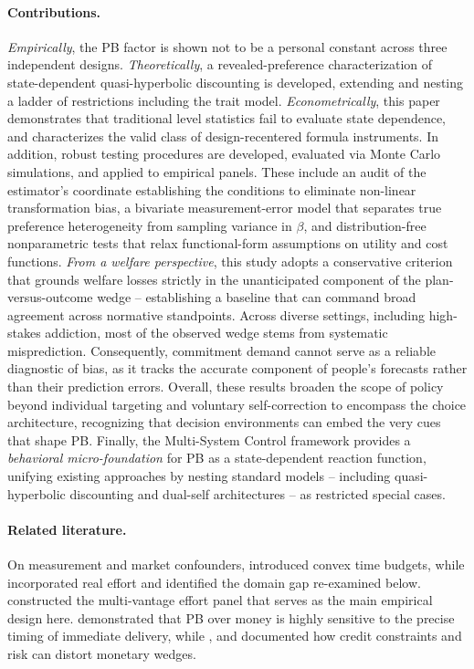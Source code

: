 \documentclass[11pt,a4paper]{article}
\theoremstyle{plain}
\theoremstyle{definition}
\begin{document}
\paragraph{Contributions.} 
\emph{Empirically}, the PB factor is shown not to be a personal constant across three independent designs. 
\emph{Theoretically}, a revealed-preference characterization of state-dependent quasi-hyperbolic discounting is developed, extending \citet{eis2020} and nesting a ladder of restrictions including the trait model.
\emph{Econometrically}, this paper demonstrates that traditional level statistics fail to evaluate state dependence, and characterizes the valid class of design-recentered formula instruments. %
In addition, robust testing procedures are developed, evaluated via Monte Carlo simulations, and applied to empirical panels. These include an audit of the estimator's coordinate establishing the conditions to eliminate non-linear transformation bias, a bivariate measurement-error model that separates true preference heterogeneity from sampling variance in $\beta$, and distribution-free nonparametric tests that relax functional-form assumptions on utility and cost functions. 
\emph{From a welfare perspective}, this study adopts a conservative criterion that grounds welfare losses strictly in the unanticipated component of the plan-versus-outcome wedge -- establishing a baseline that can command broad agreement across normative standpoints. 
Across diverse settings, including high-stakes addiction, most of the observed wedge stems from systematic misprediction. Consequently, commitment demand cannot serve as a reliable diagnostic of bias, as it tracks the accurate component of people's forecasts rather than their prediction errors.
Overall, these results broaden the scope of policy beyond individual targeting and voluntary self-correction to encompass the choice architecture, recognizing that decision environments can embed the very cues that shape PB.
Finally, the Multi-System Control framework provides a \emph{behavioral micro-foundation} for PB as a state-dependent reaction function, unifying existing approaches by nesting standard models -- including quasi-hyperbolic discounting and dual-self architectures -- as restricted special cases.  

\paragraph{Related literature.} On measurement and market confounders, \citet{andreoni2012a} introduced convex time budgets, while \citet{ans2015} incorporated real effort and identified the domain gap re-examined below. \citet{augenblick2019} constructed the multi-vantage effort panel that serves as the main empirical design here. \citet{balakrishnan2020} demonstrated that PB over money is highly sensitive to the precise timing of immediate delivery, while \citet{deansautmann2021}, \citet{cassidy2019} and \citet{andreoni2012b} documented how credit constraints and risk can distort monetary wedges.
\end{document}
